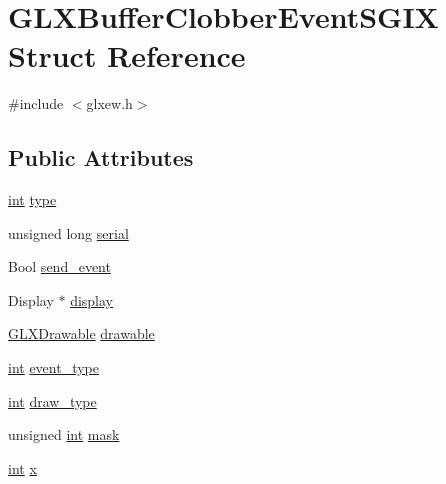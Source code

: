 \hypertarget{struct_g_l_x_buffer_clobber_event_s_g_i_x}{\section{G\-L\-X\-Buffer\-Clobber\-Event\-S\-G\-I\-X Struct Reference}
\label{struct_g_l_x_buffer_clobber_event_s_g_i_x}
}


{\ttfamily \#include $<$glxew.\-h$>$}

\subsection*{Public Attributes}
\begin{DoxyCompactItemize}
\item 
\hyperlink{_s_d_l__thread_8h_a6a64f9be4433e4de6e2f2f548cf3c08e}{int} \hyperlink{struct_g_l_x_buffer_clobber_event_s_g_i_x_a36e3e8a5feea664623ea43d0f273b63a}{type}
\item 
unsigned long \hyperlink{struct_g_l_x_buffer_clobber_event_s_g_i_x_ac295e3276a7986eeae4d6a2a28c7e0b7}{serial}
\item 
Bool \hyperlink{struct_g_l_x_buffer_clobber_event_s_g_i_x_af43bf0edbe40a74ef58dfb546a75118b}{send\-\_\-event}
\item 
Display $\ast$ \hyperlink{struct_g_l_x_buffer_clobber_event_s_g_i_x_ab1a082fa6ac0aa7a37f358738cc073e8}{display}
\item 
\hyperlink{_g_l_e_w_2glxew_8h_a826f51745d9d6c81bdbac47ae2b80cf7}{G\-L\-X\-Drawable} \hyperlink{struct_g_l_x_buffer_clobber_event_s_g_i_x_a9c45674193ed80a79261c3b7518ee04f}{drawable}
\item 
\hyperlink{_s_d_l__thread_8h_a6a64f9be4433e4de6e2f2f548cf3c08e}{int} \hyperlink{struct_g_l_x_buffer_clobber_event_s_g_i_x_a0b405123f1d6528f1f4dfa7ff92bde9b}{event\-\_\-type}
\item 
\hyperlink{_s_d_l__thread_8h_a6a64f9be4433e4de6e2f2f548cf3c08e}{int} \hyperlink{struct_g_l_x_buffer_clobber_event_s_g_i_x_a25c31e8cbec0919f74a1e93ae74175b1}{draw\-\_\-type}
\item 
unsigned \hyperlink{_s_d_l__thread_8h_a6a64f9be4433e4de6e2f2f548cf3c08e}{int} \hyperlink{struct_g_l_x_buffer_clobber_event_s_g_i_x_a74b4ad1ad3cac011001151411f621da1}{mask}
\item 
\hyperlink{_s_d_l__thread_8h_a6a64f9be4433e4de6e2f2f548cf3c08e}{int} \hyperlink{struct_g_l_x_buffer_clobber_event_s_g_i_x_a5118d48c3c8d5253d39922b5014b52ff}{x}
\item 

\end{DoxyCompactItemize}
